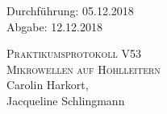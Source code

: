 

\begin{titlepage}
  \begin{flushleft}
 Durchführung: 05.12.2018\\
 Abgabe: 12.12.2018\\
  \end{flushleft}



 \begin{center}


\textsc{\LARGE Praktikumsprotokoll V53}\\[1.5cm]
\textsc{\huge Mikrowellen auf Hohlleitern} \\[5,5cm]

Carolin Harkort\footnotemark[1], \\
Jacqueline Schlingmann\footnotemark[2] \\[1,0cm]



 \end{center}

 \vfill

\end{titlepage}


  
  

\nocite{*}
\printbibliography

